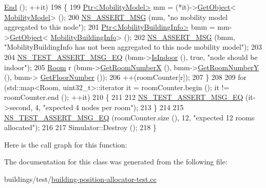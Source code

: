 \begin{DoxyCode}
      \hyperlink{classns3_1_1NodeContainer_a8ea0bcac137597d192c5e6b95ca60464}{End} (); ++it)
198     \{
199       \hyperlink{classns3_1_1Ptr}{Ptr<MobilityModel>} mm = (*it)->\hyperlink{classns3_1_1Object_a13e18c00017096c8381eb651d5bd0783}{GetObject}<
      \hyperlink{classns3_1_1MobilityModel}{MobilityModel}> ();
200       \hyperlink{assert_8h_aff5ece9066c74e681e74999856f08539}{NS\_ASSERT\_MSG} (mm, \textcolor{stringliteral}{"no mobility model aggregated to this node"});
201       \hyperlink{classns3_1_1Ptr}{Ptr<MobilityBuildingInfo>} bmm = mm->\hyperlink{classns3_1_1Object_a13e18c00017096c8381eb651d5bd0783}{GetObject}<
      \hyperlink{classns3_1_1MobilityBuildingInfo}{MobilityBuildingInfo}> ();
202       \hyperlink{assert_8h_aff5ece9066c74e681e74999856f08539}{NS\_ASSERT\_MSG} (bmm, \textcolor{stringliteral}{"MobilityBuildingInfo has not been aggregated to this node mobility
       model"});
203 
204       \hyperlink{group__testing_ga2a9d78cffb3db8e867c35fff0b698cf5}{NS\_TEST\_ASSERT\_MSG\_EQ} (bmm->\hyperlink{classns3_1_1MobilityBuildingInfo_a2bba20054cc48efcca2d5e0c46f8171c}{IsIndoor} (), \textcolor{keyword}{true}, \textcolor{stringliteral}{"node should be indoor"});
205       \hyperlink{structRoom}{Room} r (bmm->\hyperlink{classns3_1_1MobilityBuildingInfo_ad40faf32d419734e8c86f630e66ab18d}{GetRoomNumberX} (), bmm->\hyperlink{classns3_1_1MobilityBuildingInfo_a5297704859be8e1d3ad22ea3f5f93dbd}{GetRoomNumberY} (), bmm->
      \hyperlink{classns3_1_1MobilityBuildingInfo_aedb2647206f2dae0aa98ec9ac11873c7}{GetFloorNumber} ());
206       ++(roomCounter[r]);
207     \}
208 
209   \textcolor{keywordflow}{for} (std::map<Room, uint32\_t>::iterator it = roomCounter.begin (); it != roomCounter.end (); ++it)
210     \{
211 
212       \hyperlink{group__testing_ga2a9d78cffb3db8e867c35fff0b698cf5}{NS\_TEST\_ASSERT\_MSG\_EQ} (it->second, 4, \textcolor{stringliteral}{"expected 4 nodes per room"});
213     \}
214 
215   \hyperlink{group__testing_ga2a9d78cffb3db8e867c35fff0b698cf5}{NS\_TEST\_ASSERT\_MSG\_EQ} (roomCounter.size (), 12, \textcolor{stringliteral}{"expected 12 rooms allocated"});
216 
217   Simulator::Destroy ();
218 \}
\end{DoxyCode}


Here is the call graph for this function\+:




The documentation for this class was generated from the following file\+:\begin{DoxyCompactItemize}
\item 
buildings/test/\hyperlink{building-position-allocator-test_8cc}{building-\/position-\/allocator-\/test.\+cc}\end{DoxyCompactItemize}

